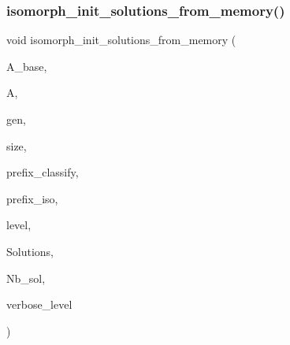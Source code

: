 \subsubsection{\texorpdfstring{isomorph\+\_\+init\+\_\+solutions\+\_\+from\+\_\+memory()}{isomorph\_init\_solutions\_from\_memory()}}
{\footnotesize\ttfamily void isomorph\+\_\+init\+\_\+solutions\+\_\+from\+\_\+memory (\begin{DoxyParamCaption}\item[{\mbox{\hyperlink{classaction}{action}} $\ast$}]{A\+\_\+base,  }\item[{\mbox{\hyperlink{classaction}{action}} $\ast$}]{A,  }\item[{\mbox{\hyperlink{classgenerator}{generator}} $\ast$}]{gen,  }\item[{\mbox{\hyperlink{galois_8h_a09fddde158a3a20bd2dcadb609de11dc}{I\+NT}}}]{size,  }\item[{const \mbox{\hyperlink{galois_8h_ab6cc7b4aeb6ea31aba2b3fbfc83ff5e6}{B\+Y\+TE}} $\ast$}]{prefix\+\_\+classify,  }\item[{const \mbox{\hyperlink{galois_8h_ab6cc7b4aeb6ea31aba2b3fbfc83ff5e6}{B\+Y\+TE}} $\ast$}]{prefix\+\_\+iso,  }\item[{\mbox{\hyperlink{galois_8h_a09fddde158a3a20bd2dcadb609de11dc}{I\+NT}}}]{level,  }\item[{\mbox{\hyperlink{galois_8h_a09fddde158a3a20bd2dcadb609de11dc}{I\+NT}} $\ast$$\ast$}]{Solutions,  }\item[{\mbox{\hyperlink{galois_8h_a09fddde158a3a20bd2dcadb609de11dc}{I\+NT}} $\ast$}]{Nb\+\_\+sol,  }\item[{\mbox{\hyperlink{galois_8h_a09fddde158a3a20bd2dcadb609de11dc}{I\+NT}}}]{verbose\+\_\+level }\end{DoxyParamCaption})}

\mbox{\label{isomorph__global_8_c_a697da824ab34db5c830530fb3c97df24}} 
